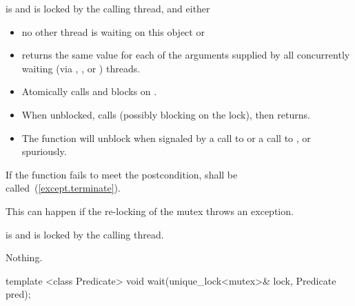 \begin{itemdescr}
\pnum
\precondition {} is  and 
is locked by the calling thread, and either
\begin{itemize}
\item no other thread is waiting on this  object or
\item {} returns the same value for each of the 
arguments supplied by all concurrently waiting (via ,
, or ) threads.
\end{itemize}

\pnum\effects
\begin{itemize}
\item Atomically calls  and blocks on .
\item When unblocked, calls  (possibly blocking on the lock), then returns.
\item The function will unblock when signaled by a call to 
or a call to , or spuriously.
\end{itemize}

\pnum
\remarks
If the function fails to meet the postcondition, 
shall be called~(\ref{except.terminate}).
\begin{note} This can happen if the re-locking of the mutex throws an exception. \end{note}

\pnum
\postcondition {} is  and 
is locked by the calling thread.

\pnum\throws Nothing.

\end{itemdescr}

%
%
\begin{itemdecl}
template <class Predicate>
  void wait(unique_lock<mutex>& lock, Predicate pred);
\end{itemdecl}

